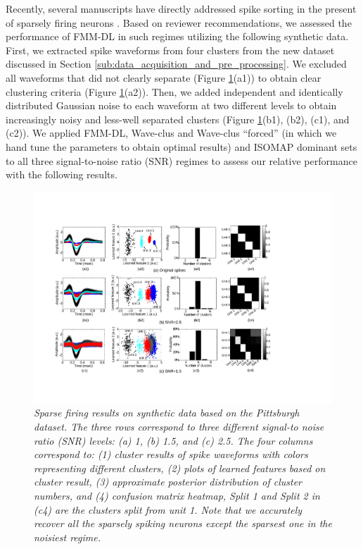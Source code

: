 \documentclass[journal]{IEEEtran}
\begin{document}
Recently, several manuscripts have directly addressed spike sorting in the present of sparsely firing neurons \cite{Pedreira2012, Adamos2012}.  Based on reviewer recommendations, we assessed the performance of FMM-DL in such regimes utilizing the following synthetic data.  First, we extracted spike waveforms from four clusters from the new dataset discussed in Section \ref{sub:data_acquisition_and_pre_processing}.  We excluded all waveforms that did not clearly separate (Figure \ref{fig:Sparse_firing_neuron}(a1))
to obtain clear clustering criteria (Figure \ref{fig:Sparse_firing_neuron}(a2)).  Then, we added independent and identically distributed Gaussian noise to each waveform at two different levels to obtain increasingly noisy and less-well separated clusters (Figure \ref{fig:Sparse_firing_neuron}(b1), (b2), (c1), and (c2)).  We applied FMM-DL, Wave-clus \cite{Pedreira2012} and Wave-clus ``forced'' (in which we hand tune the parameters to obtain optimal results) and ISOMAP dominant sets \cite{Adamos2012} to all three signal-to-noise ratio (SNR) regimes to assess our relative performance with the following results.

\begin{figure}[!htbp]
\centering

   \includegraphics[width=1.0\linewidth]{figs_new/sparse_firing.pdf}
  \caption{\small \emph{
Sparse firing results on synthetic data based on the Pittsburgh dataset. 
The three rows correspond to three different signal-to noise ratio (SNR) levels: (a) 1, (b) 1.5, and (c) 2.5. The four columns correspond to: (1) cluster results of spike waveforms with colors representing different clusters, (2) plots of learned features  based on cluster result, (3) approximate posterior distribution of cluster numbers, and (4) confusion matrix heatmap, Split 1 and Split 2 in (c4) are the clusters split from unit 1. Note that we accurately recover all the sparsely spiking neurons except the sparsest one in the noisiest regime.
   }}
   \label{fig:Sparse_firing_neuron}
\end{figure}
\end{document}
